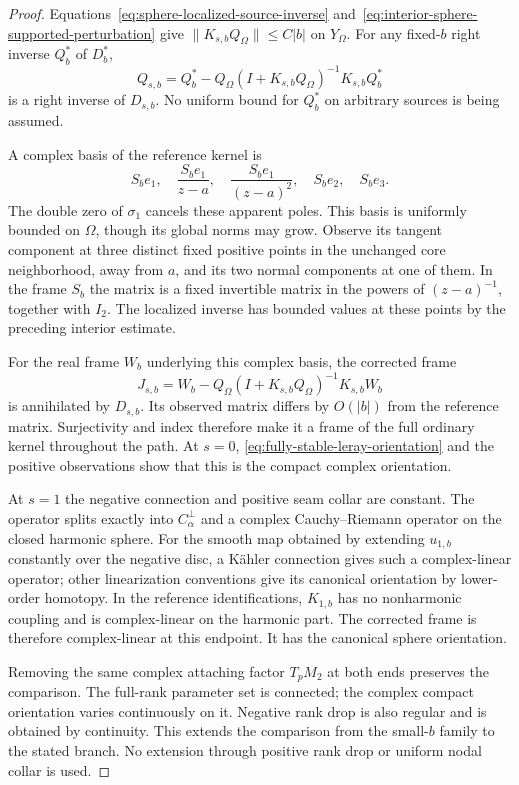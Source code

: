 \documentclass[11pt]{amsart}
\theoremstyle{definition}
\theoremstyle{remark}
\theoremstyle{plain}
\begin{document}
\begin{proof}
Equations~\eqref{eq:sphere-localized-source-inverse}
and~\eqref{eq:interior-sphere-supported-perturbation}
give $\|K_{s,b}Q_\Omega\|\le C|b|$ on $Y_\Omega$.
For any fixed-$b$ right inverse $Q_b^*$ of $D_b^*$,
\[
 Q_{s,b}=Q_b^*-Q_\Omega
       (I+K_{s,b}Q_\Omega)^{-1}K_{s,b}Q_b^*
\]
is a right inverse of $D_{s,b}$. No uniform bound
for $Q_b^*$ on arbitrary sources is being assumed.

A complex basis of the reference kernel is
\[
 S_be_1,\quad \frac{S_be_1}{z-a},\quad
 \frac{S_be_1}{(z-a)^2},\quad S_be_2,\quad S_be_3.
\]
The double zero of $\sigma_1$ cancels these apparent
poles. This basis is uniformly bounded on $\Omega$,
though its global norms may grow.
Observe its tangent component at three distinct
fixed positive points in the unchanged core
neighborhood, away from $a$, and its two normal
components at one of them. In the frame $S_b$ the
matrix is a fixed invertible matrix in the powers
of $(z-a)^{-1}$, together with $I_2$.
The localized inverse has bounded values at these
points by the preceding interior estimate.

For the real frame $W_b$ underlying this complex
basis, the corrected frame
\[
 J_{s,b}=W_b-Q_\Omega
          (I+K_{s,b}Q_\Omega)^{-1}K_{s,b}W_b
\]
is annihilated by $D_{s,b}$. Its observed matrix
differs by $O(|b|)$ from the reference matrix.
Surjectivity and index therefore make it a frame
of the full ordinary kernel throughout the path.
At $s=0$, \eqref{eq:fully-stable-leray-orientation}
and the positive observations show that this is
the compact complex orientation.

At $s=1$ the negative connection and positive
seam collar are constant. The operator splits
exactly into $C_\alpha^\perp$ and a complex
Cauchy--Riemann operator on the closed harmonic
sphere. For the smooth map obtained by extending
$u_{1,b}$ constantly over the negative disc,
a K\"ahler connection gives such a complex-linear
operator; other linearization conventions give
its canonical orientation by lower-order homotopy.
In the reference identifications, $K_{1,b}$ has
no nonharmonic coupling and is complex-linear
on the harmonic part. The corrected frame is
therefore complex-linear at this endpoint.
It has the canonical sphere orientation.

Removing the same complex attaching factor
$T_pM_2$ at both ends preserves the comparison.
The full-rank parameter set is connected; the
complex compact orientation varies continuously
on it. Negative rank drop is also regular and
is obtained by continuity. This extends the
comparison from the small-$b$ family to the
stated branch. No extension through positive
rank drop or uniform nodal collar is used.
\end{proof}
\end{document}
